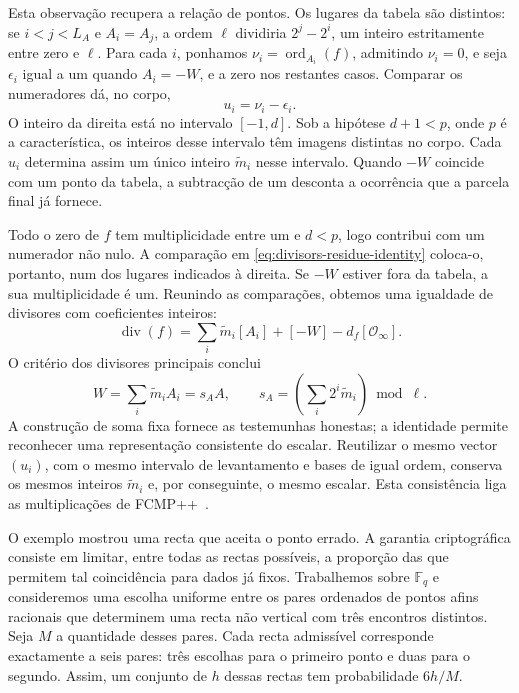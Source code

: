 Esta observação recupera a relação de pontos. Os lugares da tabela são
distintos: se \(i<j<L_A\) e \(A_i=A_j\), a ordem \(\ell\)
dividiria \(2^j-2^i\), um inteiro estritamente entre zero e
\(\ell\). Para cada \(i\), ponhamos
\(\nu_i=\operatorname{ord}_{A_i}(f)\), admitindo \(\nu_i=0\),
e seja \(\epsilon_i\) igual a um quando \(A_i=-W\), e a zero
nos restantes casos. Comparar os numeradores dá, no corpo,
\[
 u_i=\nu_i-\epsilon_i.
\]
O inteiro da direita está no intervalo \([-1,d]\). Sob a hipótese
\(d+1<p\), onde \(p\) é a característica, os inteiros desse
intervalo têm imagens distintas no corpo. Cada \(u_i\) determina
assim um único inteiro \(\widetilde m_i\) nesse intervalo.
Quando \(-W\) coincide com um ponto da tabela, a subtracção de um
desconta a ocorrência que a parcela final já fornece.

Todo o zero de \(f\) tem multiplicidade entre um e \(d<p\),
logo contribui com um numerador não nulo. A comparação em
\eqref{eq:divisors-residue-identity} coloca-o, portanto, num dos
lugares indicados à direita. Se \(-W\) estiver fora da tabela,
a sua multiplicidade é um. Reunindo as comparações, obtemos uma
igualdade de divisores com coeficientes inteiros:
\[
 \operatorname{div}(f)
 =\sum_i\widetilde m_i[A_i]+[-W]-d_f[\mathcal O_\infty].
\]
O critério dos divisores principais conclui
\begin{equation}
 W=\sum_i\widetilde m_i A_i=s_AA,
 \qquad
 s_A=\left(\sum_i2^i\widetilde m_i\right)\bmod\ell.
 \label{eq:divisors-extracted-scalar}
\end{equation}
A construção de soma fixa fornece as testemunhas honestas; a
identidade permite reconhecer uma representação consistente do
escalar. Reutilizar o mesmo vector \((u_i)\), com o mesmo intervalo
de levantamento e bases de igual ordem, conserva os mesmos inteiros
\(\widetilde m_i\) e, por conseguinte, o mesmo escalar. Esta
consistência liga as multiplicações de
FCMP++~\cite{eagen-divisors,monero-oxide-fcmp-source}.

O exemplo mostrou uma recta que aceita o ponto errado. A garantia
criptográfica consiste em limitar, entre todas as rectas possíveis, a
proporção das que permitem tal coincidência para dados já fixos.
Trabalhemos sobre \(\mathbb F_q\) e consideremos uma escolha uniforme entre os pares
ordenados de pontos afins racionais que determinem uma recta não
vertical com três encontros distintos. Seja \(M\) a quantidade
desses pares. Cada recta admissível corresponde exactamente a seis
pares: três escolhas para o primeiro ponto e duas para o segundo.
Assim, um conjunto de \(h\) dessas rectas tem probabilidade
\(6h/M\).

